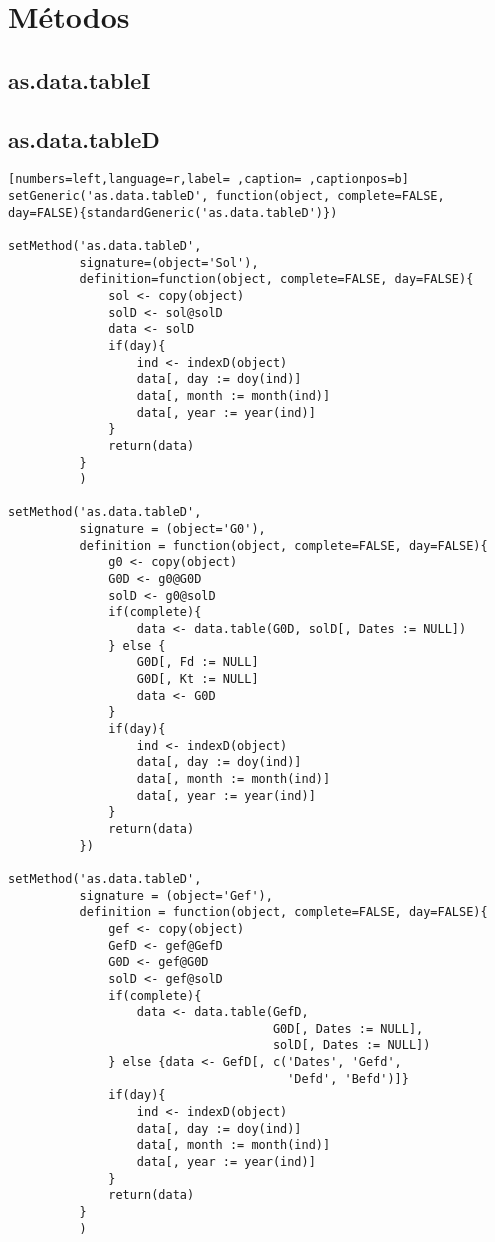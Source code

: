 \section{Métodos}
\label{sec:org7a8b25e}
\subsection{as.data.tableI}
\label{sec:orgb13db01}
\subsection{as.data.tableD}
\label{sec:orge352815}
\begin{lstlisting}[numbers=left,language=r,label= ,caption= ,captionpos=b]
setGeneric('as.data.tableD', function(object, complete=FALSE, day=FALSE){standardGeneric('as.data.tableD')})

setMethod('as.data.tableD',
          signature=(object='Sol'),
          definition=function(object, complete=FALSE, day=FALSE){
              sol <- copy(object)
              solD <- sol@solD
              data <- solD
              if(day){
                  ind <- indexD(object)
                  data[, day := doy(ind)]
                  data[, month := month(ind)]
                  data[, year := year(ind)]
              }
              return(data)
          }
          )

setMethod('as.data.tableD',
          signature = (object='G0'),
          definition = function(object, complete=FALSE, day=FALSE){
              g0 <- copy(object)
              G0D <- g0@G0D
              solD <- g0@solD
              if(complete){
                  data <- data.table(G0D, solD[, Dates := NULL])
              } else {
                  G0D[, Fd := NULL]
                  G0D[, Kt := NULL]
                  data <- G0D
              }
              if(day){
                  ind <- indexD(object)
                  data[, day := doy(ind)]
                  data[, month := month(ind)]
                  data[, year := year(ind)]
              }
              return(data)
          })

setMethod('as.data.tableD',
          signature = (object='Gef'),
          definition = function(object, complete=FALSE, day=FALSE){
              gef <- copy(object)
              GefD <- gef@GefD
              G0D <- gef@G0D
              solD <- gef@solD
              if(complete){
                  data <- data.table(GefD,
                                     G0D[, Dates := NULL],
                                     solD[, Dates := NULL])
              } else {data <- GefD[, c('Dates', 'Gefd',
                                       'Defd', 'Befd')]}
              if(day){
                  ind <- indexD(object)
                  data[, day := doy(ind)]
                  data[, month := month(ind)]
                  data[, year := year(ind)]     
              }
              return(data)
          }
          )


\end{lstlisting}
